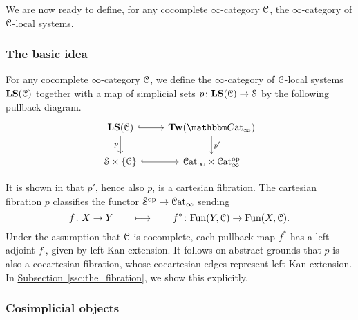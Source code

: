 \documentclass[main.tex]{subfiles}
\begin{document}
We are now ready to define, for any cocomplete $\infty$-category $\mathcal{C}$, the $\infty$-category of $\mathcal{C}$-local systems.

\subsubsection{The basic idea}
\label{sss:the_infinity_category_of_local_systems}


\begin{definition}
  For any cocomplete $\infty$-category $\mathcal{C}$, we define the $\infty$-category of $\mathcal{C}$-local systems $\mathbf{LS}(\mathcal{C})$ together with a map of simplicial sets $p\colon \mathbf{LS}(\mathcal{C}) \to \mathcal{S}$ by the following pullback diagram.
  \begin{equation}
    \label{eq:pullback_square_defining_local_systems}
    \begin{tikzcd}
      \LS(\category{C})
      \arrow[r, hook]
      \arrow[d, swap, "p"]
      & \Tw(\ICCat)
      \arrow[d, "p'"]
      \\
      \S \times \{\category{C}\}
      \arrow[r, hook]
      & \ICat \times \ICat\op
    \end{tikzcd}
  \end{equation}
\end{definition}

It is shown in \cite{garcia2020enhanced} that $p'$, hence also $p$, is a cartesian fibration. The cartesian fibration $p$ classifies the functor $\mathcal{S}^{\mathrm{op}} \to \mathcal{C}\mathrm{at}_{\infty}$ sending
\begin{equation*}
  f\colon X \to Y \qquad \longmapsto \qquad f^{*}\colon \mathrm{Fun}(Y, \mathcal{C}) \to \mathrm{Fun}(X, \mathcal{C}).
\end{equation*}
Under the assumption that $\mathcal{C}$ is cocomplete, each pullback map $f^{*}$ has a left adjoint $f_{!}$, given by left Kan extension. It follows on abstract grounds that $p$ is also a cocartesian fibration, whose cocartesian edges represent left Kan extension. In \hyperref[ssc:the_fibration]{Subsection~\ref*{ssc:the_fibration}}, we show this explicitly.

\subsubsection{Cosimplicial objects}
\label{sss:cosimplicial_objects}
\end{document}
